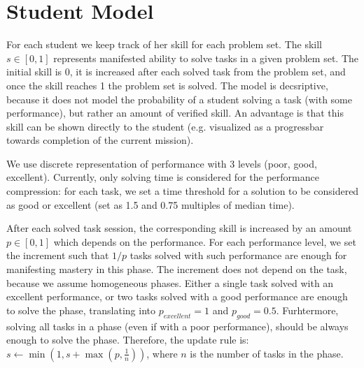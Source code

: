 \section{Student Model}

For each student we keep track of her skill for each problem set. %
The skill $s \in [0, 1]$ represents manifested ability to solve tasks in
a given problem set. The initial skill is 0, it is increased after each solved
task from the problem set, and once the skill reaches 1 the problem set is solved.
The model is decsriptive, because it does not model the probability of
a student solving a task (with some performance), but rather an amount
of verified skill.
An advantage is that this skill can be shown directly to the student
(e.g. visualized as a progressbar towards completion of the current mission).

We use discrete representation of performance with 3 levels (poor, good,
excellent). Currently, only solving time is considered for the performance
compression: for each task, we set a time threshold for a solution to be
considered as good or excellent
(set as 1.5 and 0.75 multiples of median time).

After each solved task session, the corresponding skill is increased by
an amount $p \in [0, 1]$ which depends on the performance.
For each performance level, we set the increment such that $1/p$ tasks solved
with such performance are enough for manifesting mastery in this phase.
The increment does not depend on the task, because we assume homogeneous
phases.  %
Either a single task solved with an excellent performance, or two
tasks solved with a good performance are enough to solve the phase,
translating into $p_{excellent} = 1$ and $p_{good} = 0.5$.
Furhtermore, solving all tasks in a phase (even if with a poor performance),
should be always enough to solve the phase.
Therefore, the update rule is:
$s \leftarrow \min(1, s + \max(p, \frac{1}{n}))$,
where $n$ is the number of tasks in the phase.

